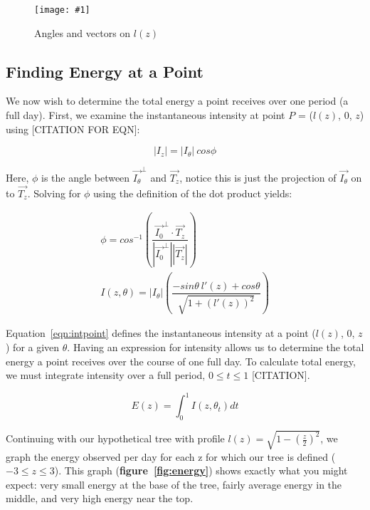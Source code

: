 \documentclass[10pt,twocolumn]{article}
\newlength{\imgwidth}
\newcommand\scalegraphics[1]{%
    \settowidth{\imgwidth}{\texttt{[image: \#1]}}%
    \setlength{\imgwidth}{\minof{\imgwidth}{\columnwidth}}%
    \texttt{[image: \#1]}%
}
\begin{document}
\begin{figure}[h!]
  \centering
  \caption{Angles and vectors on $l(z)$}
  \scalegraphics{img/vectors.png}
  \label{fig:vectors}
\end{figure}

\subsection{Finding Energy at a Point}
We now wish to determine the total energy a point receives over one
period (a full day). First, we examine the instantaneous intensity at
point $P$ = ($l(z)$, 0, $z$) using [CITATION FOR EQN]:
\begin{center}
  \begin{equation}\label{eqn:intbasic}
    |I_z| = |I_\theta| \  cos\phi
  \end{equation}
\end{center}

Here, $\phi$ is the angle between $\vec{I_\theta}^{\perp}$ and
$\vec{T_z}$, notice this is just the projection of $\vec{I_\theta}$ on
to $\vec{T_z}$. Solving for $\phi$ using the definition of the dot
product yields:

\begin{center}
  \begin{gather}
    \phi = cos^{-1} \left(\dfrac{\vec{I_0}^{\perp} \cdot \vec{T_z}}{|\vec{I_0}^{\perp}| |\vec{T_z}|}\right) \\
    I(z,\theta) = |I_\theta|\left(\dfrac{-sin\theta \  l'(z) + cos\theta}{\sqrt{1+(l'(z))^2}}\right)\label{eqn:intpoint}
  \end{gather}
\end{center}

Equation~\eqref{eqn:intpoint} defines the instantaneous intensity at a
point ($l(z)$, 0, $z$) for a given $\theta$. Having an expression for
intensity allows us to determine the total energy a point receives
over the course of one full day. To calculate total energy, we must
integrate intensity over a full period, $0 \le t \le 1$ [CITATION].

\begin{center}
  \begin{equation}
    E(z) = \int_0^1 I(z,\theta_t) dt
  \end{equation}
\end{center}

Continuing with our hypothetical tree with profile $l(z) =
\sqrt{1-(\frac{z}{2})^2}$, we graph the energy observed per day for
each z for which our tree is defined ($-3 \le z \le 3$). This graph
({\bf figure~\ref{fig:energy}}) shows exactly what you might expect:
very small energy at the base of the tree, fairly average energy in
the middle, and very high energy near the top.
\end{document}
